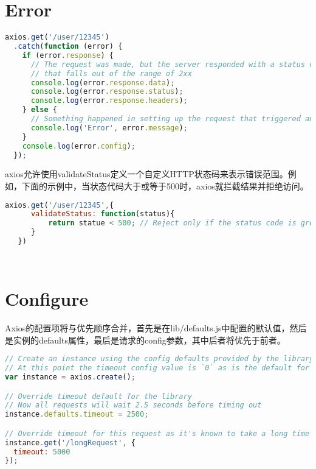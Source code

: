 \chapter{Error}



\begin{lstlisting}[language=JavaScript]
axios.get('/user/12345')
  .catch(function (error) {
    if (error.response) {
      // The request was made, but the server responded with a status code
      // that falls out of the range of 2xx
      console.log(error.response.data);
      console.log(error.response.status);
      console.log(error.response.headers);
    } else {
      // Something happened in setting up the request that triggered an Error
      console.log('Error', error.message);
    }
    console.log(error.config);
  });
\end{lstlisting}

axios允许使用validateStatus定义一个自定义HTTP状态码来表示错误范围。例如，下面的示例中，当状态代码大于或等于500时，axios就拦截结果并拒绝访问。

\begin{lstlisting}[language=JavaScript]
axios.get('/user/12345',{
      validateStatus: function(status){
          return statue < 500; // Reject only if the status code is greater than or equal to 500
      }
   })
\end{lstlisting}






\begin{lstlisting}[language=JavaScript]

\end{lstlisting}



\begin{lstlisting}[language=JavaScript]

\end{lstlisting}




\chapter{Configure}


Axios的配置项将与优先顺序合并，首先是在lib/defaults.js中配置的默认值，然后是实例的defaults属性，最后是请求的config参数，其中后者将优先于前者。 


\begin{lstlisting}[language=JavaScript]
// Create an instance using the config defaults provided by the library
// At this point the timeout config value is `0` as is the default for the library
var instance = axios.create();

// Override timeout default for the library
// Now all requests will wait 2.5 seconds before timing out
instance.defaults.timeout = 2500;

// Override timeout for this request as it's known to take a long time
instance.get('/longRequest', {
  timeout: 5000
});
\end{lstlisting}


